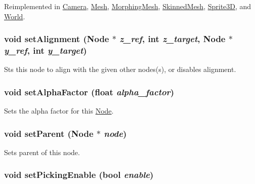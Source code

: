 Reimplemented in \hyperlink{classm3g_1_1Camera_1efcb1973989d9963d5bd6d03065d389}{Camera}, \hyperlink{classm3g_1_1Mesh_1efcb1973989d9963d5bd6d03065d389}{Mesh}, \hyperlink{classm3g_1_1MorphingMesh_1efcb1973989d9963d5bd6d03065d389}{MorphingMesh}, \hyperlink{classm3g_1_1SkinnedMesh_1efcb1973989d9963d5bd6d03065d389}{SkinnedMesh}, \hyperlink{classm3g_1_1Sprite3D_1efcb1973989d9963d5bd6d03065d389}{Sprite3D}, and \hyperlink{classm3g_1_1World_1efcb1973989d9963d5bd6d03065d389}{World}.\hypertarget{classm3g_1_1Node_dd1627aba90e63c166ecd3d7463d735a}{
\subsubsection[{setAlignment}]{\setlength{\rightskip}{0pt plus 5cm}void setAlignment ({\bf Node} $\ast$ {\em z\_\-ref}, \/  int {\em z\_\-target}, \/  {\bf Node} $\ast$ {\em y\_\-ref}, \/  int {\em y\_\-target})}}
\label{classm3g_1_1Node_dd1627aba90e63c166ecd3d7463d735a}


Sts this node to align with the given other nodes(s), or disables alignment. \hypertarget{classm3g_1_1Node_b33c321ce240770e5eb64d0e20ea61cc}{
\subsubsection[{setAlphaFactor}]{\setlength{\rightskip}{0pt plus 5cm}void setAlphaFactor (float {\em alpha\_\-factor})}}
\label{classm3g_1_1Node_b33c321ce240770e5eb64d0e20ea61cc}


Sets the alpha factor for this \hyperlink{classm3g_1_1Node}{Node}. \hypertarget{classm3g_1_1Node_880ecc7c1c091f7607eeae12ed100a9a}{
\subsubsection[{setParent}]{\setlength{\rightskip}{0pt plus 5cm}void setParent ({\bf Node} $\ast$ {\em node})}}
\label{classm3g_1_1Node_880ecc7c1c091f7607eeae12ed100a9a}


Sets parent of this node. \hypertarget{classm3g_1_1Node_4f9296202713ac56ccae72d5e0c21d96}{
\subsubsection[{setPickingEnable}]{\setlength{\rightskip}{0pt plus 5cm}void setPickingEnable (bool {\em enable})}}
\label{classm3g_1_1Node_4f9296202713ac56ccae72d5e0c21d96}


